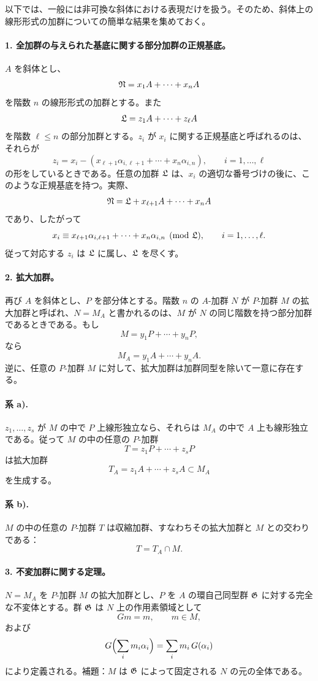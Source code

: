 以下では、一般には非可換な斜体における表現だけを扱う。そのため、斜体上の線形形式の加群についての簡単な結果を集めておく。

\paragraph{1. 全加群の与えられた基底に関する部分加群の正規基底。}
\(A\) を斜体とし、
\[
        \mathfrak N=x_1A+\cdots+x_nA
\]
を階数 \(n\) の線形形式の加群とする。また
\[
        \mathfrak L=z_1A+\cdots+z_\ell A
\]
を階数 \(\ell\le n\) の部分加群とする。\(z_i\) が \(x_i\) に関する正規基底と呼ばれるのは、それらが
\[
        z_i=x_i-(x_{\ell+1}\alpha_{i,\ell+1}+\cdots+x_n\alpha_{i,n}),
        \qquad i=1,\ldots,\ell
\]
の形をしているときである。任意の加群 \(\mathfrak L\) は、\(x_i\) の適切な番号づけの後に、このような正規基底を持つ。実際、
\[
        \mathfrak N=\mathfrak L+x_{\ell+1}A+\cdots+x_nA
\]
であり、したがって
\[
        x_i\equiv x_{\ell+1}\alpha_{i,\ell+1}+\cdots+x_n\alpha_{i,n}
        \pmod{\mathfrak L},\qquad i=1,\ldots,\ell.
\]
従って対応する \(z_i\) は \(\mathfrak L\) に属し、\(\mathfrak L\) を尽くす。

\paragraph{2. 拡大加群。}
再び \(A\) を斜体とし、\(P\) を部分体とする。階数 \(n\) の \(A\)-加群 \(N\) が \(P\)-加群 \(M\) の拡大加群と呼ばれ、\(N=M_A\) と書かれるのは、\(M\) が \(N\) の同じ階数を持つ部分加群であるときである。もし
\[
        M=y_1P+\cdots+y_nP,
\]
なら
\[
        M_A=y_1A+\cdots+y_nA.
\]
逆に、任意の \(P\)-加群 \(M\) に対して、拡大加群は加群同型を除いて一意に存在する。

\paragraph{系 a).}
\(z_1,\ldots,z_s\) が \(M\) の中で \(P\) 上線形独立なら、それらは \(M_A\) の中で \(A\) 上も線形独立である。従って \(M\) の中の任意の \(P\)-加群
\[
        T=z_1P+\cdots+z_sP
\]
は拡大加群
\[
        T_A=z_1A+\cdots+z_sA\subset M_A
\]
を生成する。

\paragraph{系 b).}
\(M\) の中の任意の \(P\)-加群 \(T\) は収縮加群、すなわちその拡大加群と \(M\) との交わりである：
\[
        T=T_A\cap M .
\]

\paragraph{3. 不変加群に関する定理。}
\(N=M_A\) を \(P\)-加群 \(M\) の拡大加群とし、\(P\) を \(A\) の環自己同型群 \(\mathfrak G\) に対する完全な不変体とする。群 \(\mathfrak G\) は \(N\) 上の作用素領域として
\[
        Gm=m,
        \qquad m\in M,
\]
および
\[
        G\Bigl(\sum_i m_i\alpha_i\Bigr)=\sum_i m_i\,G(\alpha_i)
\]
により定義される。補題：\(M\) は \(\mathfrak G\) によって固定される \(N\) の元の全体である。

